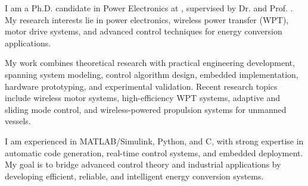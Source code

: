 

\begin{cvparagraph}

I am a Ph.D. candidate in Power Electronics at , supervised by Dr.  and Prof. . My research interests lie in power electronics, wireless power transfer (WPT), motor drive systems, and advanced control techniques for energy conversion applications.

My work combines theoretical research with practical engineering development, spanning system modeling, control algorithm design, embedded implementation, hardware prototyping, and experimental validation. Recent research topics include wireless motor systems, high-efficiency WPT systems, adaptive and sliding mode control, and wireless-powered propulsion systems for unmanned vessels.

I am experienced in MATLAB/Simulink, Python, and C, with strong expertise in automatic code generation, real-time control systems, and embedded deployment. My goal is to bridge advanced control theory and industrial applications by developing efficient, reliable, and intelligent energy conversion systems.
\end{cvparagraph}

